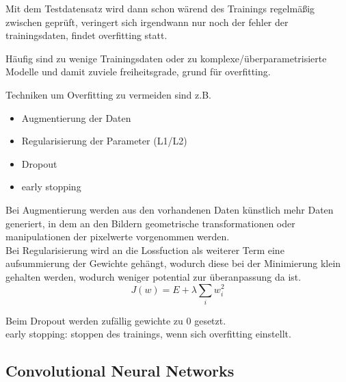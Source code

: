 Mit dem Testdatensatz wird dann schon wärend des Trainings regelmäßig zwischen geprüft, 
veringert sich irgendwann nur noch der fehler der trainingsdaten, findet overfitting statt.

%     

Häufig sind zu wenige Trainingsdaten oder zu komplexe/überparametrisierte
 Modelle und damit zuviele freiheitsgrade, grund für overfitting.



Techniken um Overfitting zu vermeiden sind z.B.
\begin{itemize}
    \item Augmentierung der Daten
    \item Regularisierung der Parameter (L1/L2)
    \item Dropout
    \item early stopping
\end{itemize}

Bei Augmentierung werden aus den vorhandenen Daten künstlich mehr 
Daten generiert, in dem an den Bildern geometrische transformationen 
oder manipulationen der pixelwerte vorgenommen werden.
\\
Bei Regularisierung wird an die Lossfuction als weiterer Term
 eine aufsummierung der Gewichte gehängt, wodurch diese bei der Minimierung 
  klein gehalten werden, wodurch weniger potential zur überanpassung da ist.
  \begin{equation}
    \label{eq:regularization}
    J(w) = E + \lambda \sum_{i} w_{i}^{2}
\end{equation}

Beim Dropout werden zufällig gewichte zu 0 gesetzt.
\\
early stopping: stoppen des trainings, wenn sich overfitting einstellt.




\subsection{Convolutional Neural Networks}\label{subsec:cnn}

